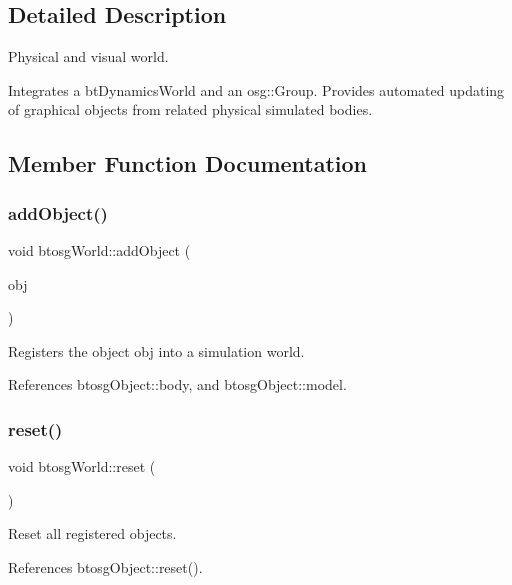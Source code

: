 \subsection{Detailed Description}
Physical and visual world. 

Integrates a bt\+Dynamics\+World and an osg\+::\+Group. Provides automated updating of graphical objects from related physical simulated bodies. 

\subsection{Member Function Documentation}
\mbox{\label{classbtosgWorld_ae5b71c6319dd420479096a265a1725b7}} 
\subsubsection{\texorpdfstring{add\+Object()}{addObject()}}
{\footnotesize\ttfamily void btosg\+World\+::add\+Object (\begin{DoxyParamCaption}\item[{class \hyperlink{classbtosgObject}{btosg\+Object} $\ast$}]{obj }\end{DoxyParamCaption})}

Registers the object obj into a simulation world. 

References btosg\+Object\+::body, and btosg\+Object\+::model.

\mbox{\label{classbtosgWorld_a6af4d066410a86b44fff5563667ea9a9}} 
\subsubsection{\texorpdfstring{reset()}{reset()}}
{\footnotesize\ttfamily void btosg\+World\+::reset (\begin{DoxyParamCaption}{ }\end{DoxyParamCaption})}

Reset all registered objects. 

References btosg\+Object\+::reset().

\mbox{\label{classbtosgWorld_afce096686d8f84afd8b8fa3f2dc161b8}} 
